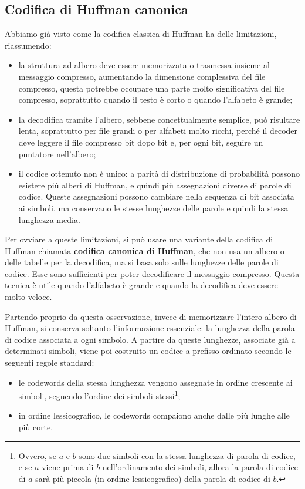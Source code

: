 \documentclass{article}
\theoremstyle{definition}
\numberwithin{equation}{section}
\begin{document}
\subsection{Codifica di Huffman canonica}
Abbiamo già visto come la codifica classica di Huffman ha delle limitazioni, riassumendo:
\begin{itemize}
    \item la struttura ad albero deve essere memorizzata o trasmessa insieme al messaggio compresso, aumentando la dimensione complessiva del file compresso, questa potrebbe occupare una parte molto significativa del file compresso, soprattutto quando il testo è corto o quando l'alfabeto è grande;
    \item la decodifica tramite l'albero, sebbene concettualmente semplice, può risultare lenta, soprattutto per file grandi o per alfabeti molto ricchi, perché il decoder deve leggere il file compresso bit dopo bit e, per ogni bit, seguire un puntatore nell'albero;
    \item il codice ottenuto non è unico: a parità di distribuzione di probabilità possono esistere più alberi di Huffman, e quindi più assegnazioni diverse di parole di codice. Queste assegnazioni possono cambiare nella sequenza di bit associata ai simboli, ma conservano le stesse lunghezze delle parole e quindi la stessa lunghezza media.
\end{itemize}
Per ovviare a queste limitazioni, si può usare una variante della codifica di Huffman chiamata \textbf{codifica canonica di Huffman}, che non usa un albero o delle tabelle per la decodifica, ma si basa solo sulle lunghezze delle parole di codice. Esse sono sufficienti per poter decodificare il messaggio compresso. Questa tecnica è utile quando l'alfabeto è grande e quando la decodifica deve essere molto veloce.

Partendo proprio da questa osservazione, invece di memorizzare l'intero albero di Huffman, si conserva soltanto l'informazione essenziale: la lunghezza della parola di codice associata a ogni simbolo. A partire da queste lunghezze, associate già a determinati simboli, viene poi costruito un codice a prefisso ordinato secondo le seguenti regole standard:
\begin{itemize}
    \item le codewords della stessa lunghezza vengono assegnate in ordine crescente ai simboli, seguendo l'ordine dei simboli stessi\footnote{Ovvero, se $a$ e $b$ sono due simboli con la stessa lunghezza di parola di codice, e se $a$ viene prima di $b$ nell'ordinamento dei simboli, allora la parola di codice di $a$ sarà più piccola (in ordine lessicografico) della parola di codice di $b$.};
    \item in ordine lessicografico, le codewords compaiono anche dalle più lunghe alle più corte.
\end{itemize}
\end{document}
